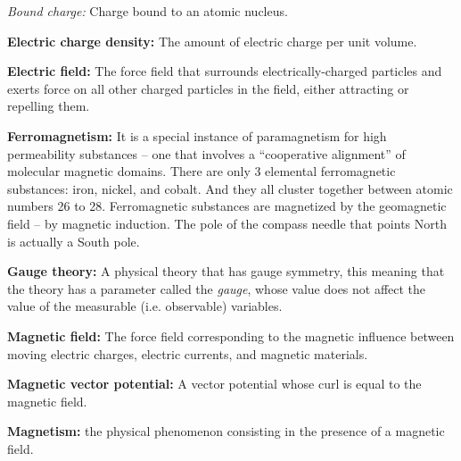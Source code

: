 \begin{list}{}{}
\begin{list}{}{}
		\item \emph{Bound charge:} Charge bound to an atomic nucleus.
	\end{list}
	
	\item \textbf{Electric charge density:} The amount of electric charge per unit volume.
	
	\item \textbf{Electric field:} The force field that surrounds electrically-charged particles and exerts force on all other charged particles in the field, either attracting or repelling them.
	
	\item \textbf{Ferromagnetism:} It is a special instance of paramagnetism for high permeability substances -- one that involves a “cooperative	alignment” of molecular magnetic domains. There are only 3 elemental ferromagnetic substances: iron, nickel, and cobalt. And they all cluster together between atomic numbers 26 to 28. Ferromagnetic substances are magnetized by the geomagnetic field -- by magnetic induction. The pole of the compass	needle that points North is actually a South pole.
	
	\item \textbf{Gauge theory:} A physical theory that has gauge symmetry, this meaning that the theory has a parameter called the \emph{gauge}, whose value does not affect the value of the measurable (i.e. observable) variables.
	
	\item \textbf{Magnetic field:} The force field corresponding to the magnetic influence between moving electric charges, electric currents, and magnetic materials.
	
	\item \textbf{Magnetic vector potential:} A vector potential whose curl is equal to the magnetic field.
	
	\item \textbf{Magnetism:} the physical phenomenon consisting in the presence of a magnetic field.
	

\end{list}
